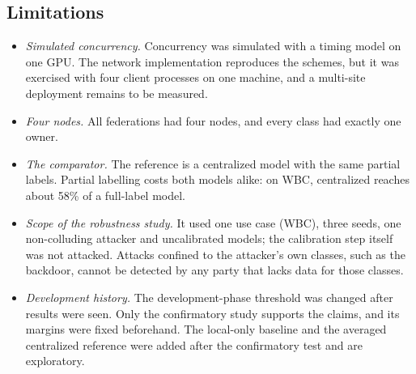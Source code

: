 \documentclass[pdflatex,sn-mathphys-num]{sn-jnl}
\begin{document}
\subsection{Limitations}
\begin{itemize}
\item \emph{Simulated concurrency.} Concurrency was simulated with a timing model on one GPU. The network implementation reproduces the schemes, but it was exercised with four client processes on one machine, and a multi-site deployment remains to be measured.
\item \emph{Four nodes.} All federations had four nodes, and every class had exactly one owner.
\item \emph{The comparator.} The reference is a centralized model with the same partial labels. Partial labelling costs both models alike: on WBC, centralized reaches about 58\% of a full-label model.
\item \emph{Scope of the robustness study.} It used one use case (WBC), three seeds, one non-colluding attacker and uncalibrated models; the calibration step itself was not attacked. Attacks confined to the attacker's own classes, such as the backdoor, cannot be detected by any party that lacks data for those classes.
\item \emph{Development history.} The development-phase threshold was changed after results were seen. Only the confirmatory study supports the claims, and its margins were fixed beforehand. The local-only baseline and the averaged centralized reference were added after the confirmatory test and are exploratory.
\end{itemize}

\end{document}
